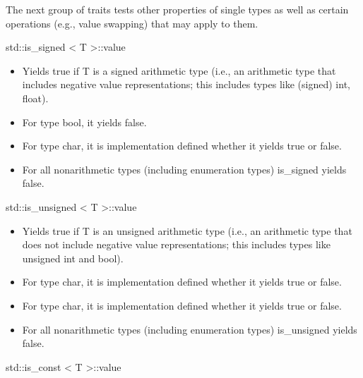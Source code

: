 
The next group of traits tests other properties of single types as well as certain operations (e.g., value swapping) that may apply to them.


std::is\_signed < T >::value

\begin{itemize}
\item 
Yields true if T is a signed arithmetic type (i.e., an arithmetic type  that includes negative value representations; this includes types like (signed) int, float).

\item 
For type bool, it yields false.

\item 
For type char, it is implementation defined whether it yields true or false.

\item 
For all nonarithmetic types (including enumeration types) is\_signed yields false.
\end{itemize}

std::is\_unsigned < T >::value

\begin{itemize}
\item 
Yields true if T is an unsigned arithmetic type (i.e., an arithmetic type that does not include negative value representations; this includes types like unsigned int and bool).

\item 
For type char, it is implementation defined whether it yields true or false.

\item 
For type char, it is implementation defined whether it yields true or false.

\item 
For all nonarithmetic types (including enumeration types) is\_unsigned yields false.
\end{itemize}

std::is\_const < T >::value

